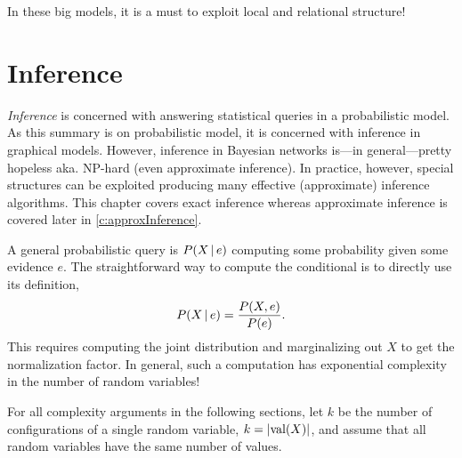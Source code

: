 		In these big models, it is a must to exploit local and relational structure!

\chapter{Inference}
	\emph{Inference} is concerned with answering statistical queries in a probabilistic model. As this summary is on probabilistic model, it is concerned with inference in graphical models. However, inference in Bayesian networks is---in general---pretty hopeless aka. NP-hard (even approximate inference). In practice, however, special structures can be exploited producing many effective (approximate) inference algorithms. This chapter covers exact inference whereas approximate inference is covered later in \autoref{c:approxInference}.

	A general probabilistic query is \( P(X \,\vert\, e) \) computing some probability given some evidence \(e\). The straightforward way to compute the conditional is to directly use its definition,
	\begin{equation}
		P(X \,\vert\, e) = \frac{P(X, e)}{P(e)}.
	\end{equation}
	This requires computing the joint distribution and marginalizing out \(X\) to get the normalization factor. In general, such a computation has exponential complexity in the number of random variables!

	For all complexity arguments in the following sections, let \(k\) be the number of configurations of a single random variable, \( k = \lvert \operatorname{val}(X) \rvert \), and assume that all random variables have the same number of values.

